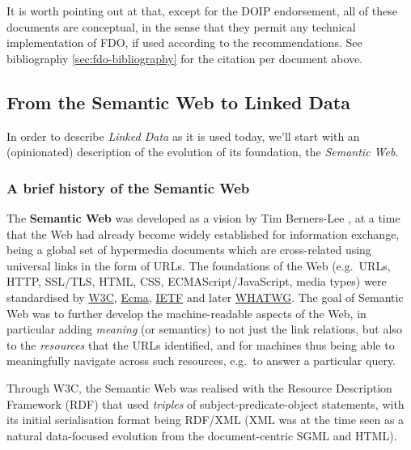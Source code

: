 \documentclass[fleqn,10pt,NOlineno]{wlpeerjlua}
\begin{document}
It is worth pointing out at that, except for the DOIP endorsement, all of these documents are conceptual, in the sense that they permit any technical implementation of FDO, if used according to the recommendations. See bibliography \vref*{sec:fdo-bibliography} for the citation per document above.

\subsection*{From the Semantic Web to Linked Data}\label{sec:ld}

In order to describe \emph{Linked Data} as it is used today, we'll start with an (opinionated) description of the evolution of its foundation, the \emph{Semantic Web}.

\subsubsection*{A brief history of the Semantic Web}\label{sec:semweb}

The \textbf{Semantic Web} was developed as a vision by Tim Berners-Lee \autocite{berners-leeWeavingWebOriginal1999}, at a time that the Web had already become widely established for information exchange, being a global set of hypermedia documents which are cross-related using universal links in the form of URLs. The foundations of the Web (e.g.~URLs, HTTP, SSL/TLS, HTML, CSS, ECMAScript/JavaScript, media types) were standardised by \href{https://www.w3.org/standards/}{W3C}, \href{https://www.ecma-international.org/}{Ecma}, \href{https://www.ietf.org/standards/}{IETF} and later \href{https://whatwg.org/}{WHATWG}. The goal of Semantic Web was to further develop the machine-readable aspects of the Web, in particular adding \emph{meaning} (or semantics) to not just the link relations, but also to the \emph{resources} that the URLs identified, and for machines thus being able to meaningfully navigate across such resources, e.g.~to answer a particular query.

Through W3C, the Semantic Web was realised with the Resource Description Framework (RDF) \autocite{w3-rdf11-primer} that used \emph{triples} of subject-predicate-object statements, with its initial serialisation format \autocite{w3-rdf-syntax99} being RDF/XML (XML was at the time seen as a natural data-focused evolution from the document-centric SGML and HTML).
\end{document}
